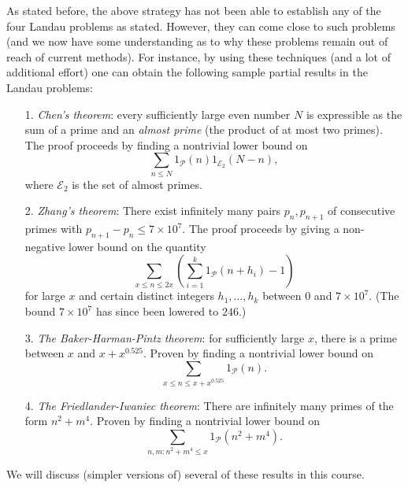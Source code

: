 \documentclass[10pt,reqno]{amsart}
\begin{document}
As stated before, the above strategy has not been able to establish any of the four Landau problems as stated. However, they can come close to such problems (and we now have some understanding as to why these problems remain out of reach of current methods). For instance, by using these techniques (and a lot of additional effort) one can obtain the following sample partial results in the Landau problems:

\begin{enumerate}
    \item[1.] \emph{Chen’s theorem}: every sufficiently large even number $N$ is expressible as the sum of a prime and an \emph{almost prime} (the product of at most two primes). The proof proceeds by finding a nontrivial lower bound on
    \[ \sum_{n \leq N} 1_{\mathcal P}(n) 1_{{\mathcal E}_2}(N-n), \]
    where $\mathcal{E}_2$ is the set of almost primes.
    
    \item[2.] \emph{Zhang’s theorem}: There exist infinitely many pairs $p_n, p_{n+1}$ of consecutive primes with $p_{n+1} - p_n \leq 7 \times 10^7$. The proof proceeds by giving a non-negative lower bound on the quantity
    \[ \sum_{x \leq n \leq 2x} (\sum_{i=1}^k 1_{\mathcal P}(n+h_i) - 1) \]
    for large $x$ and certain distinct integers $h_1,\dots,h_k$ between $0$ and $7 \times 10^7$. (The bound $7 \times 10^7$ has since been lowered to $246$.)
    
    \item[3.] \emph{The Baker-Harman-Pintz theorem}: for sufficiently large $x$, there is a prime between $x$ and $x + x^{0.525}$. Proven by finding a nontrivial lower bound on
    \[ \sum_{x \leq n \leq x+x^{0.525}} 1_{\mathcal P}(n). \]

    \item[4.] \emph{The Friedlander-Iwaniec theorem}: There are infinitely many primes of the form $n^2+m^4$. Proven by finding a nontrivial lower bound on
    \[ \sum_{n,m: n^2+m^4 \leq x} 1_{{\mathcal P}}(n^2+m^4). \]
\end{enumerate}
%
We will discuss (simpler versions of) several of these results in this course.
\end{document}

